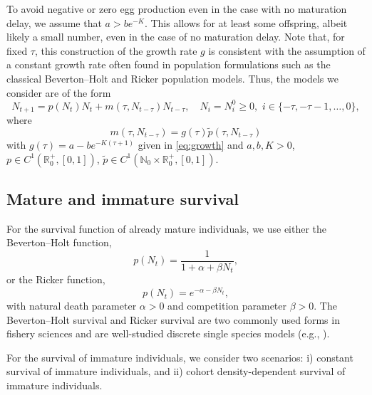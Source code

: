 \documentclass{article}
\numberwithin{theorem}{section}
\begin{document}
{To avoid negative or zero egg production even in the case with no maturation delay, we assume that $a>be^{-K}$. This allows for at least some offspring, albeit likely a small number, even in the case of no maturation delay. Note that, for fixed $\tau$, this construction of the growth rate $g$ is consistent with the assumption of a constant growth rate often found in population formulations such as the classical Beverton--Holt and Ricker population models. 
Thus, the models we consider are of the form
\begin{equation}\label{EqmainT1}
N_{t+1}=p(N_t)N_t+m(\tau,N_{t-\tau})N_{t-\tau}, \quad N_i=N_i^0 \geq 0, \, \, i  \in \{-\tau, -\tau-1, \ldots, 0\},
\end{equation}
where 
\begin{equation}\label{eq:mtaugen}
m(\tau,N_{t-\tau})=g(\tau)\widetilde{p}(\tau,N_{t-\tau})
\end{equation}
with $g(\tau)=a-be^{-K(\tau+1)}$ given in \eqref{eq:growth} and $a, b, K>0$, $p\in C^1(\mathbb{R}^+_0, [0,1])$, $\widetilde{p}\in C^1(\mathbb{N}_0\times \mathbb{R}^+_0, [0,1])$.

\subsection{Mature and immature survival}

For the survival function of already mature individuals, we use either the Beverton--Holt function,
\begin{equation} \label{eqn:BHmatsurvival}
    p(N_t)=\frac{1}{1+\alpha+\beta N_t},
\end{equation}
or the Ricker function,
\begin{equation} \label{eqn:Rmatsurvival}
    p(N_t)=e^{-\alpha-\beta N_t},
\end{equation}
with natural death parameter $\alpha>0$ and competition parameter $\beta>0$. The Beverton--Holt survival and Ricker survival are two commonly used forms in fishery sciences \cite{BH, Hilborn, Quinn, Ricker} and are well-studied discrete single species models (e.g.,  \cite{brauer2013mathematical, may2001stability,Keshet}).

For the survival of immature individuals, we consider two scenarios: i) constant survival of immature individuals, and ii) cohort density-dependent survival of immature individuals.

}
\end{document}
